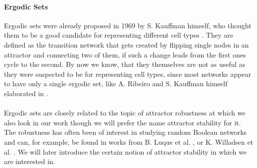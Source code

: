 \paragraph*{Ergodic Sets}\label{sec:ergodic_set}
Ergodic sets were already proposed in 1969 by S. Kauffman himself, who thought them to be a good candidate for representing different cell types \cite{kauffman1969metabolic}. They are defined as the transition network that gets created by flipping single nodes in an attractor and connecting two of them, if such a change leads from the first ones cycle to the second. By now we know, that they themselves are not as useful as they were suspected to be for representing cell types, since most networks appear to have only a single ergodic set, like A. Ribeiro and S. Kauffman himself elaborated in \cite{ribeiro2007noisy}. 

\paragraph*{}
Ergodic sets are closely related to the topic of attractor robustness at which we also look in our work though we will prefer the name attractor stability for it. The robustness has often been of interest in studying random Boolean networks and can, for example, be found in works from B. Luque et al. \cite{luque1998stable}, or K. Willadsen et al. \cite{willadsen2008understanding}. We will later introduce the certain notion of attractor stability in which we are interested in.

\newpage\thispagestyle{empty}